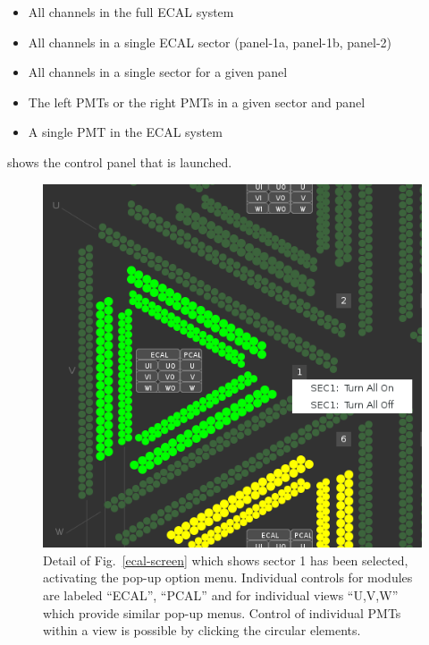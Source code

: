 \documentclass[letterpaper,10pt]{article}
\begin{document}
\begin{itemize}
\item All channels in the full ECAL system
\item All channels in a single ECAL sector (panel-1a, panel-1b, panel-2)
\item All channels in a single sector for a given panel
\item The left PMTs or the right PMTs in a given sector and panel
\item A single PMT in the ECAL system
\end{itemize}

shows the control panel that is launched.

\begin{figure}[htbp]
  \centering
  \includegraphics[width= 5in, keepaspectratio = true]{ecal-hv-screen-5}
  \vspace{2mm}
  \caption{Detail of Fig.~\ref{ecal-screen} which shows sector 1
    has been selected, activating the pop-up option menu.  Individual controls for modules are
    labeled ``ECAL'', ``PCAL'' and for individual views ``U,V,W'' which provide similar pop-up menus.
    Control of individual PMTs within a view is possible by clicking the circular elements.  }
  \label{ecal-screen2}
\end{figure}
\end{document}
